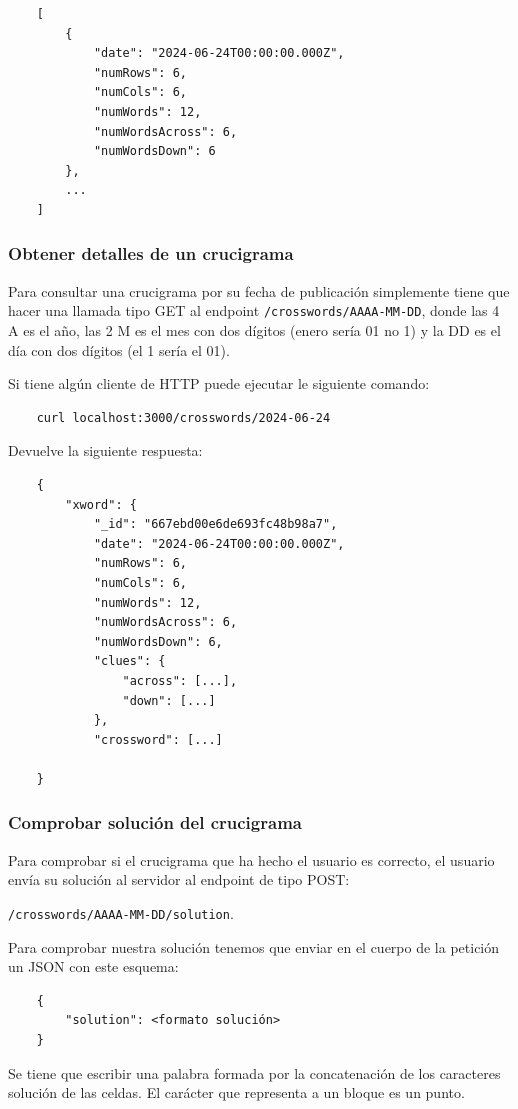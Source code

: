 \documentclass[12pt, a4paper]{article}
\begin{document}
\begin{verbatim}
	[
		{
			"date": "2024-06-24T00:00:00.000Z",
			"numRows": 6,
			"numCols": 6,
			"numWords": 12,
			"numWordsAcross": 6,
			"numWordsDown": 6
		},
		...
	]
\end{verbatim}

\subsubsection{Obtener detalles de un crucigrama}

Para consultar una crucigrama por su fecha de publicación simplemente tiene
que hacer una llamada tipo GET al endpoint \verb*|/crosswords/AAAA-MM-DD|,
donde las 4 A es el año, las 2 M es el mes con dos dígitos (enero sería
01 no 1) y la DD es el día con dos dígitos (el 1 sería el 01).

Si tiene algún cliente de HTTP puede ejecutar le siguiente comando:

\begin{verbatim}
	curl localhost:3000/crosswords/2024-06-24
\end{verbatim}

Devuelve la siguiente respuesta:

\begin{verbatim}
	{
		"xword": {
			"_id": "667ebd00e6de693fc48b98a7",
			"date": "2024-06-24T00:00:00.000Z",
			"numRows": 6,
			"numCols": 6,
			"numWords": 12,
			"numWordsAcross": 6,
			"numWordsDown": 6,
			"clues": {
				"across": [...],
				"down": [...]
			},
			"crossword": [...]
		
	}
\end{verbatim}

\subsubsection{Comprobar solución del crucigrama}

Para comprobar si el crucigrama que ha hecho el usuario es correcto, el
usuario envía su solución al servidor al endpoint de tipo POST:

\verb*|/crosswords/AAAA-MM-DD/solution|.

Para comprobar nuestra solución tenemos que enviar en el cuerpo
de la petición un JSON con este esquema:

\begin{verbatim}
	{
		"solution": <formato solución>
	}
\end{verbatim}

Se tiene que escribir una palabra formada por la concatenación de los caracteres
solución de las celdas. El carácter que representa a un bloque es un punto.
\end{document}
